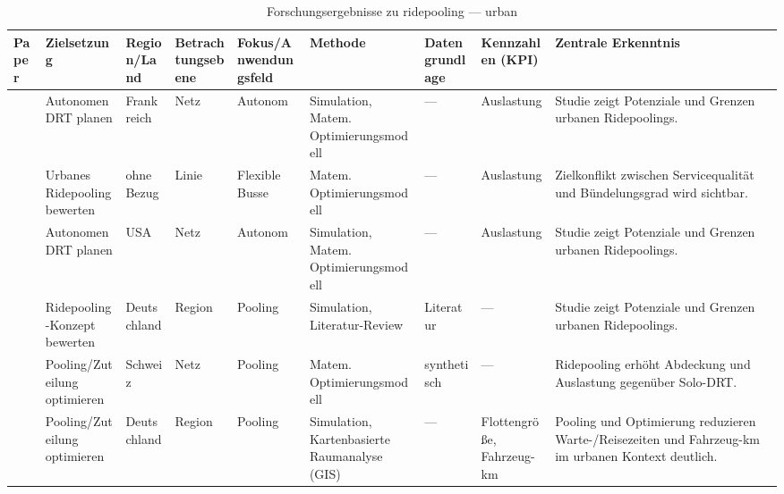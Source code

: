 \begin{table}[p]
\centering
\caption{Forschungsergebnisse zu ridepooling — urban}
\label{tab:ridepooling-urban-5}
\scriptsize
\setlength{\tabcolsep}{2.5pt}
\begin{tabularx}{\textwidth}{
  >{\RaggedRight\arraybackslash}p{2.8cm}
  >{\RaggedRight\arraybackslash}p{2.2cm}
  >{\RaggedRight\arraybackslash}p{1.8cm}
  >{\RaggedRight\arraybackslash}p{1.8cm}
  >{\RaggedRight\arraybackslash}p{2.0cm}
  >{\RaggedRight\arraybackslash}p{2.6cm}
  >{\RaggedRight\arraybackslash}p{1.8cm}
  >{\RaggedRight\arraybackslash}p{2.2cm}
  >{\RaggedRight\arraybackslash}X
}
\toprule
Paper & Zielsetzung & Region/Land & Betrachtungsebene & Fokus/Anwendungsfeld & Methode & Datengrundlage & Kennzahlen (KPI) & Zentrale Erkenntnis \\
\midrule
\textcite{vosooghi\_2019\_sharedautonomousve} & Autonomen DRT planen & Frankreich & Netz & Autonom & Simulation, Matem. Optimierungsmodell & — & Auslastung & Studie zeigt Potenziale und Grenzen urbanen Ridepoolings. \\ \hline
\textcite{wallar\_2018\_vehiclerebalancing} & Urbanes Ridepooling bewerten & ohne Bezug & Linie & Flexible Busse & Matem. Optimierungsmodell & — & Auslastung & Zielkonflikt zwischen Servicequalität und Bündelungsgrad wird sichtbar. \\ \hline
\textcite{wen\_2018\_transitorientedaut} & Autonomen DRT planen & USA & Netz & Autonom & Simulation, Matem. Optimierungsmodell & — & Auslastung & Studie zeigt Potenziale und Grenzen urbanen Ridepoolings. \\ \hline
\textcite{zwick\_2021\_ridepoolingefficie} & Ridepooling-Konzept bewerten & Deutschland & Region & Pooling & Simulation, Literatur-Review & Literatur & — & Studie zeigt Potenziale und Grenzen urbanen Ridepoolings. \\ \hline
\textcite{zwick\_2020\_analysisofridepool} & Pooling/Zuteilung optimieren & Schweiz & Netz & Pooling & Matem. Optimierungsmodell & synthetisch & — & Ridepooling erhöht Abdeckung und Auslastung gegenüber Solo-DRT. \\ \hline
\textcite{zwick\_2022\_ridepoolingdemandp} & Pooling/Zuteilung optimieren & Deutschland & Region & Pooling & Simulation, Kartenbasierte Raumanalyse (GIS) & — & Flottengröße, Fahrzeug-km & Pooling und Optimierung reduzieren Warte-/Reisezeiten und Fahrzeug-km im urbanen Kontext deutlich. \\ \hline
\bottomrule
\end{tabularx}
\end{table}

